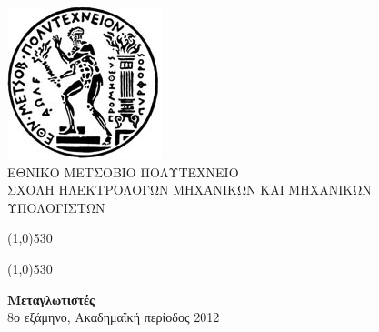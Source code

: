 \documentclass[12pt]{article}
\begin{document}
\begin{titlepage}
\begin{center}

\includegraphics[scale=0.3]{pyrforos.jpg}\\
ΕΘΝΙΚΟ ΜΕΤΣΟΒΙΟ ΠΟΛΥΤΕΧΝΕΙΟ \\
ΣΧΟΛΗ ΗΛΕΚΤΡΟΛΟΓΩΝ ΜΗΧΑΝΙΚΩΝ KΑΙ ΜΗΧΑΝΙΚΩΝ ΥΠΟΛΟΓΙΣΤΩΝ \\ 
\vspace{0.5em}

\medskip 

\def\doubleline{

    \vspace{0.1em}
    \line(1,0){530}\

    \vspace{-1.5em}
    \line(1,0){530}

}
\doubleline
\vspace{1.3em}

{\large \textbf{Μεταγλωτιστές}\\
 \medskip
8ο εξάμηνο, Ακαδημαϊκή περίοδος 2012 \\ \bigskip \medskip}


\end{center}
\end{titlepage}
\end{document}
